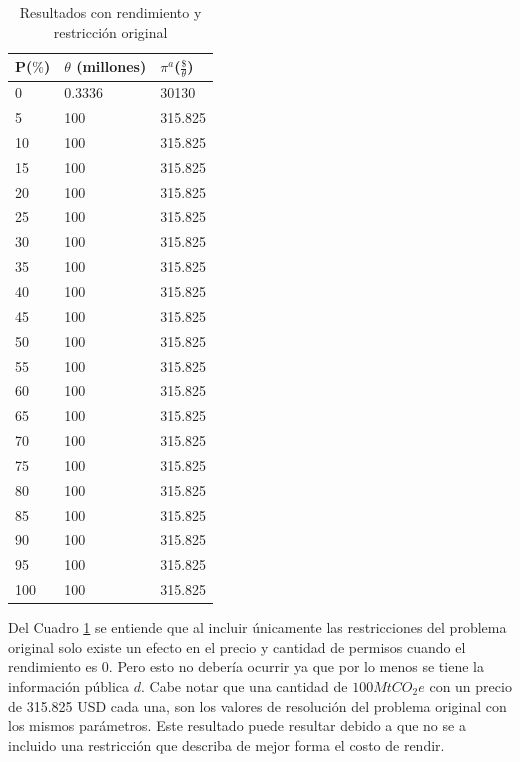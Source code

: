 \begin{table}[H]
\centering
\begin{tabular}{|l|l|l|}
\hline
\textbf{P($\%$)} & \textbf{$\theta$ (millones)} & \textbf{$\pi^a$($\frac{\$}{\theta}$)} \\ \hline
0 & 0.3336 & 30130 \\ \hline
5 & 100 & 315.825 \\ \hline
10 & 100 & 315.825 \\ \hline
15 & 100 & 315.825 \\ \hline
20 & 100 & 315.825 \\ \hline
25 & 100 & 315.825 \\ \hline
30 & 100 & 315.825 \\ \hline
35 & 100 & 315.825 \\ \hline
40 & 100 & 315.825 \\ \hline
45 & 100 & 315.825 \\ \hline
50 & 100 & 315.825 \\ \hline
55 & 100 & 315.825 \\ \hline
60 & 100 & 315.825 \\ \hline
65 & 100 & 315.825 \\ \hline
70 & 100 & 315.825 \\ \hline
75 & 100 & 315.825 \\ \hline
80 & 100 & 315.825 \\ \hline
85 & 100 & 315.825 \\ \hline
90 & 100 & 315.825 \\ \hline
95 & 100 & 315.825 \\ \hline
100 & 100 & 315.825 \\ \hline
\end{tabular}
\caption{Resultados con rendimiento y restricción original}
\label{tabla:conrestr}
\end{table}

Del Cuadro \ref{tabla:conrestr} se entiende que al incluir únicamente las restricciones del problema original solo existe un efecto en el precio y cantidad de permisos cuando el rendimiento es 0. Pero esto no debería ocurrir ya que por lo menos se tiene la información pública $d$. Cabe notar que una cantidad de $100 MtCO_2 e$ con un precio de 315.825 USD cada una, son los valores de resolución del problema original con los mismos parámetros. Este resultado puede resultar debido a que no se a incluido una restricción que describa de mejor forma el costo de rendir.

